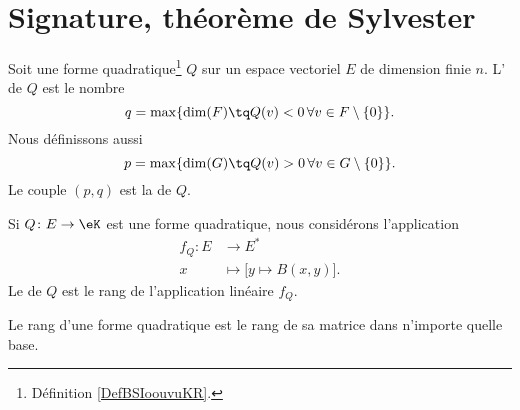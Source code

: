 \section{Signature, théorème de Sylvester}

\begin{definition}       \label{DEFooWDCLooDkRYLK}
	Soit une forme quadratique\footnote{Définition \ref{DefBSIoouvuKR}.} \( Q\) sur un espace vectoriel \( E\) de dimension finie \( n\). L' de \( Q\) est le nombre
	\begin{equation}
		q=\max\{ \dim(F)\tq Q(v)<0\,\forall v\in F\setminus\{ 0 \} \}.
	\end{equation}
	Nous définissons aussi
	\begin{equation}
		p=\max\{ \dim(G)\tq Q(v)>0\,\forall v\in G\setminus\{ 0 \} \}.
	\end{equation}
	Le couple \( (p,q)\) est la  de \( Q\).
\end{definition}

\begin{definition}        \label{DEFooVITQooQaMaTF}
	Si \( Q\colon E\to \eK\) est une forme quadratique, nous considérons l'application
	\begin{equation}
		\begin{aligned}
			f_Q\colon E & \to E^*                              \\
			x           & \mapsto \big[ y\mapsto B(x,y) \big].
		\end{aligned}
	\end{equation}
	Le  de \( Q\) est le rang de l'application linéaire \( f_Q\).
\end{definition}

\begin{proposition}     \label{PROPooLRZQooSfprff}
	Le rang d'une forme quadratique est le rang de sa matrice dans n'importe quelle base.
\end{proposition}

